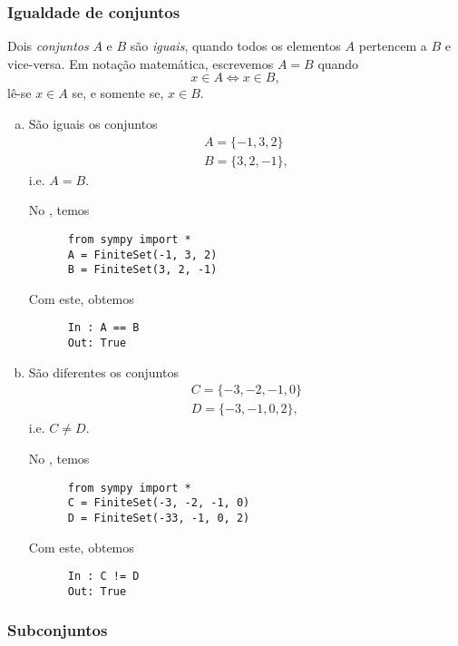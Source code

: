 \subsubsection{Igualdade de conjuntos}

Dois \emph{conjuntos} $A$ e $B$ são \emph{iguais}, quando todos os elementos $A$ pertencem a $B$ e vice-versa. Em notação matemática, escrevemos $A=B$ quando
\begin{equation}
  x\in A \Leftrightarrow x\in B,
\end{equation}
lê-se $x\in A$ se, e somente se, $x\in B$.

\begin{ex}
  \begin{enumerate}[a)]
  \item São iguais os conjuntos
    \begin{gather}
      A = \{-1, 3, 2\}\\
      B = \{3, 2, -1\},
    \end{gather}
    i.e. $A = B$.

    \ifispython
    No \python, temos
    \begin{lstlisting}
      from sympy import *
      A = FiniteSet(-1, 3, 2)
      B = FiniteSet(3, 2, -1)
    \end{lstlisting}
    Com este, obtemos
    \begin{lstlisting}
      In : A == B
      Out: True
    \end{lstlisting}
    \fi

  \item São diferentes os conjuntos
    \begin{gather}
      C = \{-3, -2, -1, 0\}\\
      D = \{-3, -1, 0, 2\},
    \end{gather}
    i.e. $C\neq D$.

    \ifispython
    No \python, temos
    \begin{lstlisting}
      from sympy import *
      C = FiniteSet(-3, -2, -1, 0)
      D = FiniteSet(-33, -1, 0, 2)
    \end{lstlisting}
    Com este, obtemos
    \begin{lstlisting}
      In : C != D
      Out: True
    \end{lstlisting}
    \fi
  \end{enumerate}
\end{ex}

\subsubsection{Subconjuntos}

